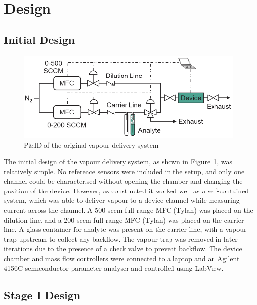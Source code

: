 \documentclass[
  a4paper,
]{scrbook}
\begin{document}
\hypertarget{sec-vapour-system-design}{%
\section{Design}\label{sec-vapour-system-design}}

\hypertarget{initial-design}{%
\subsection{Initial Design}\label{initial-design}}

\begin{figure}

{\centering \includegraphics[width=1\textwidth,height=\textheight]{figures/ch5/PID_V0.png}

}

\caption{\label{fig-original-pid}P\&ID of the original vapour delivery
system}

\end{figure}

The initial design of the vapour delivery system, as shown in
Figure~\ref{fig-original-pid}, was relatively simple. No reference
sensors were included in the setup, and only one channel could be
characterised without opening the chamber and changing the position of
the device. However, as constructed it worked well as a self-contained
system, which was able to deliver vapour to a device channel while
measuring current across the channel. A 500 sccm full-range MFC (Tylan)
was placed on the dilution line, and a 200 sccm full-range MFC (Tylan)
was placed on the carrier line. A glass container for analyte was
present on the carrier line, with a vapour trap upstream to collect any
backflow. The vapour trap was removed in later iterations due to the
presence of a check valve to prevent backflow. The device chamber and
mass flow controllers were connected to a laptop and an Agilent 4156C
semiconductor parameter analyser and controlled using LabView.

\hypertarget{sec-vapour-system-design-1}{%
\subsection{Stage I Design}\label{sec-vapour-system-design-1}}
\end{document}
